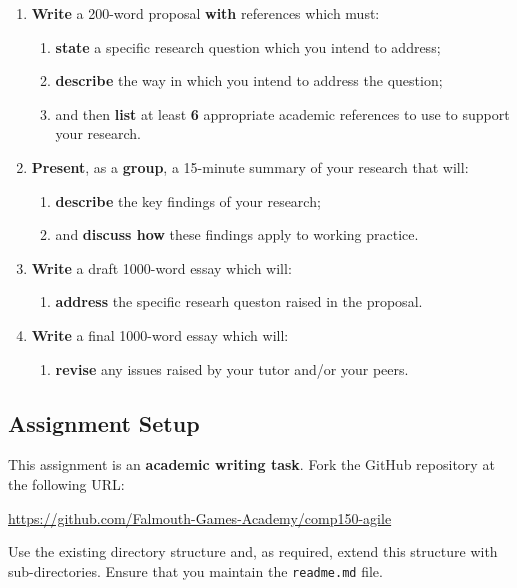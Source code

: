 \documentclass{../fal_assignment}
\begin{document}
\begin{enumerate}[label=(\alph*)]
    \item \textbf{Write} a 200-word proposal \textbf{with} references which must:
    	\begin{enumerate}[label=\roman*.]
    		\item \textbf{state} a specific research question which you intend to address;
    		\item \textbf{describe} the way in which you intend to address the question;
    		\item and then \textbf{list} at least \textbf{6} appropriate academic references to use to support your research.
	\end{enumerate}
    \item \textbf{Present}, as a \textbf{group}, a 15-minute summary of your research that will:
    	\begin{enumerate}[label=\roman*.]
    		\item \textbf{describe} the key findings of your research;
    		\item and \textbf{discuss how} these findings apply to working practice.
	\end{enumerate}
    \item \textbf{Write} a draft 1000-word essay which will:
    	\begin{enumerate}[label=\roman*.]
    		\item \textbf{address} the specific researh queston raised in the proposal.
	\end{enumerate}
    \item \textbf{Write} a final 1000-word essay which will:
    	\begin{enumerate}[label=\roman*.]
    		\item \textbf{revise} any issues raised by your tutor and/or your peers.
	\end{enumerate}
\end{enumerate}

\subsection*{Assignment Setup}

This assignment is an \textbf{academic writing task}. Fork the GitHub repository at the following URL:

\indent \url{https://github.com/Falmouth-Games-Academy/comp150-agile}

Use the existing directory structure and, as required, extend this structure with sub-directories. Ensure that you maintain the \texttt{readme.md} file.
\end{document}
